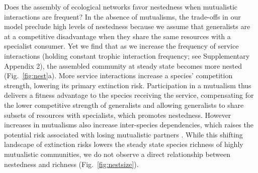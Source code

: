 \documentclass[twocolumn,preprintnumbers,amsmath,amssymb,superscriptaddress,linenumbers]{revtex4-1}
\newcommand{\rev}[1]{\textcolor{crimson}{#1}}
\begin{document}
\begin{bibunit}
Does the assembly of ecological networks favor nestedness when mutualistic interactions are frequent?
In the absence of mutualisms, the trade-offs in our model preclude high levels of nestedness because we assume that generalists are at a competitive disadvantage when they share the same resources with a specialist consumer.
Yet we find that as we increase the frequency of service interactions (holding constant trophic interaction frequency; see Supplementary Appendix 2), the assembled community at steady state becomes more nested (Fig.\ \ref{fig:nest}a).
More service interactions increase a species' competition strength, lowering its primary extinction risk.
Participation in a mutualism thus delivers a fitness advantage to the species receiving the service, compensating for the lower competitive strength of generalists and allowing generalists to share subsets of resources with specialists, which promotes nestedness.
However increases in mutualisms also increase inter-species dependencies, which raises the potential risk associated with losing mutualistic partners \cite{Bond1994,Colwell2012}. %
While this shifting landscape of extinction risks lowers the steady state species richness of highly mutualistic communities, we do not observe a direct relationship between nestedness and richness (Fig.\ \ref{fig:nestsize}).

% 






\end{bibunit}
\end{document}
